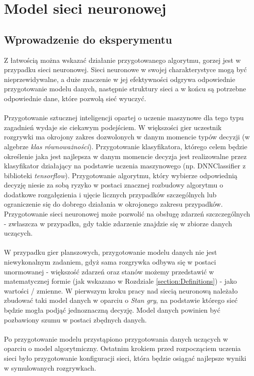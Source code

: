 \documentclass[12pt, oneside]{report}
\begin{document}
\chapter{Model sieci neuronowej}
\section{Wprowadzenie do eksperymentu}
Z łatwością można wskazać działanie przygotowanego algorytmu, gorzej jest w przypadku sieci neuronowej. Sieci neuronowe w swojej charakterystyce mogą być nieprzewidywalne, a duże znaczenie w jej efektywności odgrywa odpowiednie przygotowanie modelu danych, następnie struktury sieci a w końcu są potrzebne odpowiednie dane, które pozwolą sieć wyuczyć. \\ \\
Przygotowanie sztucznej inteligencji opartej o uczenie maszynowe dla tego typu zagadnień wydaje sie ciekawym podejściem. W większości gier uczestnik rozgrywki ma okrojony zakres dozwolonych w danym momencie typów decyzji (w algebrze  \textit{klas równoważności}). Przygotowanie klasyfikatora, którego celem będzie określenie jaka jest najlepsza w danym momencie decyzja jest realizowalne przez klasyfikator działający na podstawie uczenia maszynowego (np. DNNClassifier z biblioteki \textit{tensorflow}). Przygotowanie algorytmu, który wybierze odpowiednią decyzję niesie za sobą ryzyko w postaci znacznej rozbudowy algorytmu o dodatkowe rozgałęzienia i ujęcie licznych przypadków szczególnych lub ograniczenie się do dobrego działania w okrojonego zakresu przypadków. Przygotowanie sieci neuronowej może pozwolić na obsługę zdarzeń szczczególnych - zwłaszcza w przypadku, gdy takie zdarzenie znajdzie się w zbiorze danych uczących.
 \\ \\ W przypadku gier planszowych, przygotowanie modelu danych nie jest niewykonalnym zadaniem, gdyż sama rozgrywka odbywa się w postaci unormowanej - większość zdarzeń oraz stanów możemy przedstawić w matematycznej formie (jak wskazano w Rozdziale \ref{section:Definitions}) - jako wartości / zmienne. W pierwszym kroku pracy nad siecią neuronową należało zbudować taki model danych w oparciu o \textit{Stan gry}, na podstawie którego sieć będzie mogła podjąć jednoznaczną decyzję. Model danych powinien być pozbawiony szumu w postaci zbędnych danych.
 \\ \\ Po przygotowanie modelu przystąpiono przygotowania danych uczących w oparciu o model algorytmiczny. Ostatnim krokiem przed rozpocząciem uczenia sieci było przygotowanie konfiguracji sieci, która będzie osiągać najlepsze wyniki w symulowanych rozgrywkach.
\end{document}
